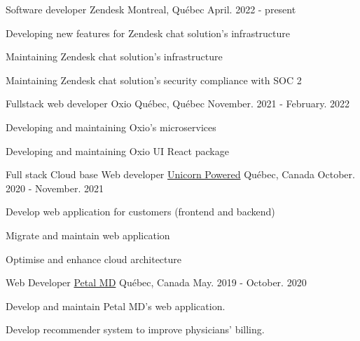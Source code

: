 


\begin{cventries}


\cventry
{Software developer} %
{Zendesk} %
{Montreal, Québec} %
{April. 2022 - present} %
{ %
\begin{cvitems}
\item {Developing new features for Zendesk chat solution's infrastructure}
\item {Maintaining Zendesk chat solution's infrastructure}
\item {Maintaining Zendesk chat solution's security compliance with SOC 2}
\end{cvitems}
}

\cventry
{Fullstack web developer} %
{Oxio} %
{Québec, Québec} %
{November. 2021 - February. 2022} %
{ %
\begin{cvitems}
\item {Developing and maintaining Oxio's microservices}
\item {Developing and maintaining Oxio UI React package}
\end{cvitems}
}

\cventry
{Full stack Cloud base Web developer} %
{\href{https://unicornpowered.com/fr/}{Unicorn Powered}} %
{Québec, Canada} %
{October. 2020 - November. 2021} %
{ %
\begin{cvitems}
\item {Develop web application for customers (frontend and backend)}
\item {Migrate and maintain web application}
\item {Optimise and enhance cloud architecture }
\end{cvitems}
}

\cventry
{Web Developer} %
{\href{https://www.petalmd.com/}{Petal MD}} %
{Québec, Canada} %
{May. 2019 - October. 2020} %
{ %
\begin{cvitems}
\item {Develop and maintain Petal MD's web application.}
\item {Develop recommender system to improve physicians' billing.}
\end{cvitems}
}\textbf{}







\end{cventries}